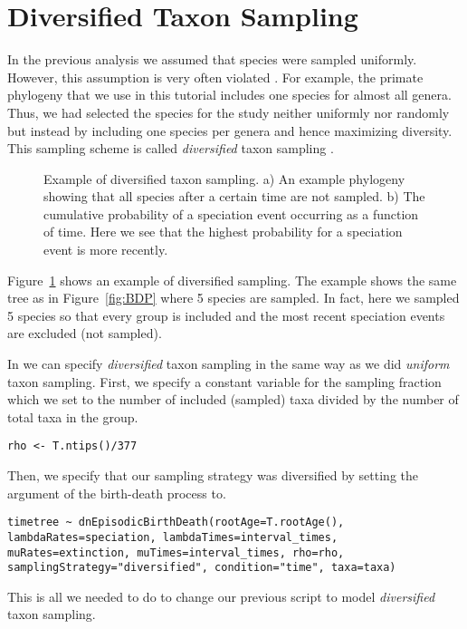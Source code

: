 \newpage
\section{Diversified Taxon Sampling}

In the previous analysis we assumed that species were sampled uniformly.
However, this assumption is very often violated \citep{Cusimano2010,Hoehna2011}.
For example, the primate phylogeny that we use in this tutorial includes one species for almost all genera.
Thus, we had selected the species for the study neither uniformly nor randomly but instead by including one species per genera and hence maximizing diversity.
This sampling scheme is called \emph{diversified} taxon sampling \citep{Hoehna2011}.

\begin{figure}[h!]
\centering
{}
\caption{\small Example of diversified taxon sampling. a) An example phylogeny showing that all species after a certain time are not sampled. b) The cumulative probability of a speciation event occurring as a function of time. Here we see that the highest probability for a speciation event is more recently.}
\label{fig:DiversifiedSampling}
\end{figure}

Figure~\ref{fig:DiversifiedSampling} shows an example of diversified sampling.
The example shows the same tree as in Figure~\ref{fig:BDP} where 5 species are sampled.
In fact, here we sampled 5 species so that every group is included and the most recent speciation events are excluded (not sampled).

In \RevBayes we can specify \emph{diversified} taxon sampling in the same way as we did \emph{uniform} taxon sampling.
First, we specify a constant variable for the sampling fraction  which we set to the number of included (sampled) taxa divided by the number of total taxa in the group.
{\tt \begin{snugshade*}
\begin{lstlisting}
rho <- T.ntips()/377
\end{lstlisting}
\end{snugshade*}}
Then, we specify that our sampling strategy was diversified by setting the argument of the birth-death process to.
{\tt \begin{snugshade*}
\begin{lstlisting}
timetree ~ dnEpisodicBirthDeath(rootAge=T.rootAge(), lambdaRates=speciation, lambdaTimes=interval_times, muRates=extinction, muTimes=interval_times, rho=rho, samplingStrategy="diversified", condition="time", taxa=taxa)
\end{lstlisting}
\end{snugshade*}}
This is all we needed to do to change our previous script to model \emph{diversified} taxon sampling.

